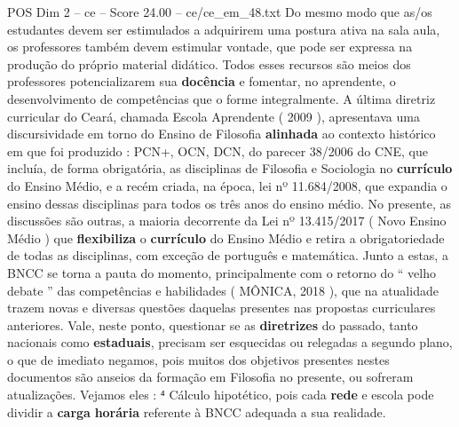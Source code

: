 \begin{textsample}{POS Dim 2 – ce – Score 24.00 – ce/ce\_em\_48.txt}
Do mesmo modo que as/os estudantes devem ser estimulados a adquirirem uma postura ativa na sala aula, os professores também devem estimular vontade, que pode ser expressa na produção do próprio material didático.
Todos esses recursos são meios dos professores potencializarem sua \textbf{docência} e fomentar, no aprendente, o desenvolvimento de competências que o forme integralmente.
A última diretriz curricular do Ceará, chamada Escola Aprendente ( 2009 ), apresentava uma discursividade em torno do Ensino de Filosofia \textbf{alinhada} ao contexto histórico em que foi produzido : PCN+, OCN, DCN, do parecer 38/2006 do CNE, que incluía, de forma obrigatória, as disciplinas de Filosofia e Sociologia no \textbf{currículo} do Ensino Médio, e a recém criada, na época, lei nº 11.684/2008, que expandia o ensino dessas disciplinas para todos os três anos do ensino médio.
No presente, as discussões são outras, a maioria decorrente da Lei nº 13.415/2017 ( Novo Ensino Médio ) que \textbf{flexibiliza} o \textbf{currículo} do Ensino Médio e retira a obrigatoriedade de todas as disciplinas, com exceção de português e matemática.
Junto a estas, a BNCC se torna a pauta do momento, principalmente com o retorno do “ velho debate ” das competências e habilidades ( MÔNICA, 2018 ), que na atualidade trazem novas e diversas questões daquelas presentes nas propostas curriculares anteriores.
Vale, neste ponto, questionar se as \textbf{diretrizes} do passado, tanto nacionais como \textbf{estaduais}, precisam ser esquecidas ou relegadas a segundo plano, o que de imediato negamos, pois muitos dos objetivos presentes nestes documentos são anseios da formação em Filosofia no presente, ou sofreram atualizações.
Vejamos eles : ⁴ Cálculo hipotético, pois cada \textbf{rede} e escola pode dividir a \textbf{carga} \textbf{horária} referente à BNCC adequada a sua realidade.

\end{textsample}
